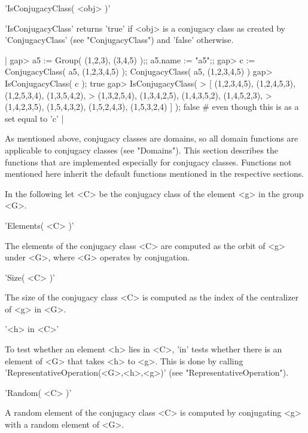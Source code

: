 'IsConjugacyClass( <obj> )'

'IsConjugacyClass' returns  'true' if  <obj>  is  a  conjugacy  class  as
created by 'ConjugacyClass' (see "ConjugacyClass") and 'false' otherwise.

|    gap> a5 := Group( (1,2,3), (3,4,5) );;  a5.name := "a5";;
    gap> c := ConjugacyClass( a5, (1,2,3,4,5) );
    ConjugacyClass( a5, (1,2,3,4,5) )
    gap> IsConjugacyClass( c );
    true
    gap> IsConjugacyClass(
    >       [ (1,2,3,4,5), (1,2,4,5,3), (1,2,5,3,4), (1,3,5,4,2),
    >         (1,3,2,5,4), (1,3,4,2,5), (1,4,3,5,2), (1,4,5,2,3),
    >         (1,4,2,3,5), (1,5,4,3,2), (1,5,2,4,3), (1,5,3,2,4) ] );
    false    # even though this is as a set equal to 'c' |


As  mentioned  above,  conjugacy  classes  are  domains,  so  all  domain
functions  are applicable  to  conjugacy  classes (see  "Domains").  This
section  describes  the functions  that  are  implemented  especially for
conjugacy  classes.   Functions  not  mentioned here  inherit the default
functions mentioned in the respective sections.

In the following let <C> be the conjugacy class of the element <g> in the
group <G>.

\vspace{5mm}
'Elements( <C> )'%

The elements of the conjugacy class <C> are computed as  the orbit of <g>
under <G>, where <G> operates by conjugation.

\vspace{5mm}
'Size( <C> )'%

The  size of  the  conjugacy  class <C>  is computed as the  index of the
centralizer of <g> in <G>.

\vspace{5mm}
'<h> in <C>'%

To test whether an element <h> lies in <C>,  'in' tests whether there  is
an element of  <G> that  takes  <h>  to <g>.   This  is  done by  calling
'RepresentativeOperation(<G>,<h>,<g>)' (see "RepresentativeOperation").

\vspace{5mm}
'Random( <C> )'%

A random element of the  conjugacy  class <C> is  computed by conjugating
<g> with a random element of <G>.

